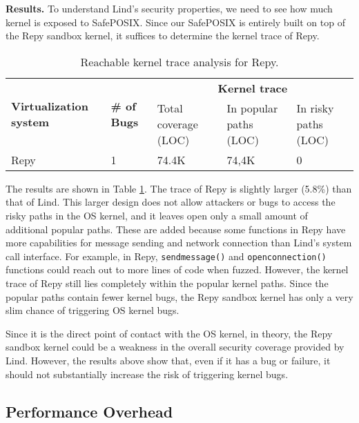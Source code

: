 {{{\noindent
\textbf{Results.}
To understand Lind's security properties, we need to see how much kernel is exposed to
SafePOSIX. Since our SafePOSIX is entirely built on top of the Repy sandbox kernel,
it suffices to determine the kernel trace of Repy.

\begin{table}
\centering
\scriptsize
\begin{tabular}{|l|l|l|l|l|}
  \hline
  \multirow{3}{1.5cm}{\bf Virtualization system} & \multirow{3}{0.5cm}{\bf \# of Bugs} & \multicolumn{3}{c|}{\bf Kernel trace} \\ \cline{3-5}
  & & \multirow{2}{1.5cm}{Total coverage (LOC)} & \multirow{2}{1.5cm}{In popular paths (LOC)} & \multirow{2}{1.5cm}{In risky paths (LOC)}  \\
  & & & & \\  \hline
  Repy & 1 & 74.4K & 74,4K & 0 \\
  \hline
\end{tabular}\caption{\small Reachable kernel trace analysis for Repy.}
\label{table:trace-Repy}
\end{table}

The results are shown in Table \ref{table:trace-Repy}.
The trace of Repy is slightly larger (5.8\%) than that of Lind.
This larger design does not allow attackers or bugs to
access the risky paths in the OS kernel, and it leaves open only a small amount of
additional popular paths. These are added because some functions in Repy
have more capabilities for message sending and network connection than Lind's
system call interface.
For example, in Repy,
\texttt{sendmessage()} and \texttt{openconnection()}
functions could reach out to more lines of code when fuzzed. However, the kernel
trace of Repy still lies completely within the popular kernel paths.
Since the popular paths contain fewer kernel bugs, the Repy sandbox kernel
has only a very slim chance of triggering OS kernel bugs.

Since it is the direct point of contact with the OS kernel, in theory, the Repy
 sandbox kernel could be a weakness in the overall security coverage provided by Lind.
However, the results above show that, even if it has a
bug or failure, it should not substantially increase the risk of triggering
kernel bugs.

\subsection{Performance Overhead}
\label{Performance-Evaluation}

}}}
